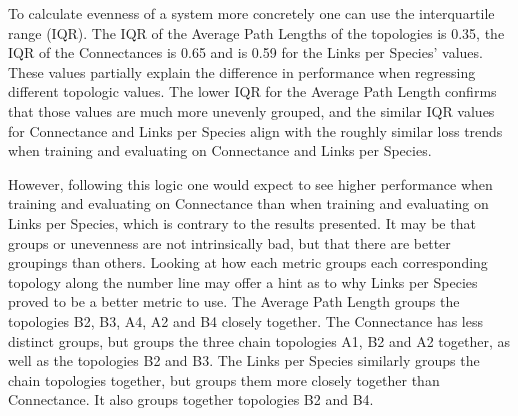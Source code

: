 \documentclass[letterpaper, 10 pt, conference]{ieeeconf}  %
\begin{document}
    To calculate evenness of a system more concretely one can use the interquartile range (IQR). The IQR of the Average Path Lengths of the topologies is 0.35, the IQR of the Connectances is 0.65 and is 0.59 for the Links per Species’ values. These values partially explain the difference in performance when regressing different topologic values. The lower IQR  for the Average Path Length confirms that those values are much more unevenly grouped, and the similar IQR values for Connectance and Links per Species align with the roughly similar loss trends when training and evaluating on Connectance and Links per Species. 
    
    However, following this logic one would expect to see higher performance when training and evaluating on Connectance than when training and evaluating on Links per Species, which is contrary to the results presented. It may be that groups or unevenness are not intrinsically bad, but that there are better groupings than others. Looking at how each metric groups each corresponding topology along the number line may offer a hint as to why Links per Species proved to be a better metric to use. The Average Path Length groups the topologies B2, B3, A4, A2 and B4 closely together. The Connectance has less distinct groups, but groups the three chain topologies A1, B2 and A2 together, as well as the topologies B2 and B3. The Links per Species similarly groups the chain topologies together, but groups them more closely together than Connectance. It also groups together topologies B2 and B4. 
    
\end{document}
